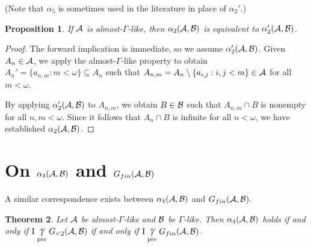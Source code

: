 \documentclass{amsart}
\theoremstyle{plain}
\newtheorem{theorem}{Theorem}
\newtheorem{proposition}[theorem]{Proposition}
\theoremstyle{definition}
\theoremstyle{remark}
\theoremstyle{plain}
\theoremstyle{definition}
\theoremstyle{remark}
\begin{document}
(Note that \(\alpha_5\) is sometimes used in the literature in place of \(\alpha_2'\).)

\begin{proposition}
If \(\mathcal{A}\) is almost-\(\Gamma\)-like, then
\(\alpha_2(\mathcal{A},\mathcal{B})\) is equivalent to \(\alpha_2'(\mathcal{A},\mathcal{B})\).
\end{proposition}

\begin{proof}
The forward implication is immediate, so we assume \(\alpha_2'(\mathcal{A},\mathcal{B})\).
Given \(A_n\in\mathcal{A}\), we apply the almost-\(\Gamma\)-like property to obtain
\(A_n'=\{a_{n,m}:m<\omega\}\subseteq A_n\) such that
\(A_{n,m}=A_n\setminus\{a_{i,j}:i,j<m\}\in\mathcal{A}\) for all \(m<\omega\).

By applying \(\alpha_2'(\mathcal{A},\mathcal{B})\) to \(A_{n,m}\), we obtain
\(B\in\mathcal{B}\) such that \(A_{n,m}\cap B\) is nonempty for all \(n,m<\omega\).
Since it follows that \(A_n\cap B\) is infinite for all \(n<\omega\),
we have established \(\alpha_2(\mathcal{A},\mathcal{B})\).
\end{proof}

\section{On \(\alpha_4(\mathcal{A},\mathcal{B})\) and \(G_{fin}(\mathcal{A},\mathcal{B})\)}

A similar correspondence exists between \(\alpha_4(\mathcal{A},\mathcal{B})\)
and \(G_{fin}(\mathcal{A},\mathcal{B})\).

\begin{theorem}
Let \(\mathcal{A}\) be almost-\(\Gamma\)-like and \(\mathcal{B}\) be \(\Gamma\)-like. 
Then \(\alpha_4(\mathcal{A},\mathcal{B})\) holds if and only
if \(\mathrm{I}\underset{\text{pre}}{\not\uparrow} G_{<2}(\mathcal{A},\mathcal{B})\) if and only if
\(\mathrm{I}\underset{\text{pre}}{\not\uparrow} G_{fin}(\mathcal{A},\mathcal{B})\).
\end{theorem}
\end{document}
